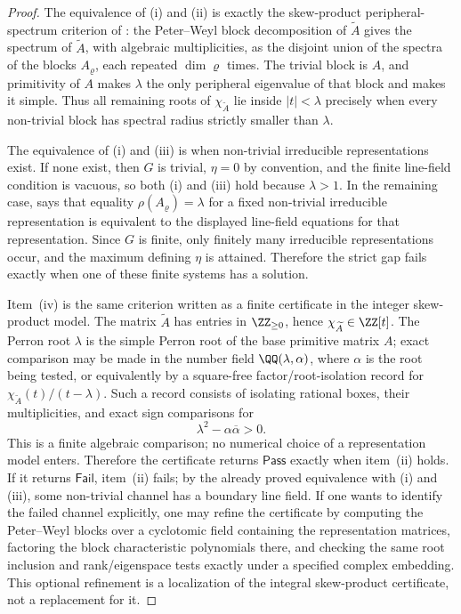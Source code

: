 \begin{proof}
  The equivalence of \rm(i) and \rm(ii) is exactly the skew-product
  peripheral-spectrum criterion of
  : the Peter--Weyl block
  decomposition of \(\widetilde A\) gives the spectrum of
  \(\widetilde A\), with algebraic multiplicities, as the disjoint union
  of the spectra of the blocks \(A_\varrho\), each repeated
  \(\dim\varrho\) times. The trivial block is \(A\), and primitivity of
  \(A\) makes \(\lambda\) the only peripheral eigenvalue of that block and
  makes it simple. Thus all remaining roots of
  \(\chi_{\widetilde A}\) lie inside \(|t|<\lambda\) precisely when every
  non-trivial block has spectral radius strictly smaller than \(\lambda\).

  The equivalence of \rm(i) and \rm(iii) is
   when non-trivial irreducible
  representations exist. If none exist, then \(G\) is trivial, \(\eta=0\)
  by convention, and the finite line-field condition is vacuous, so both
  \rm(i) and \rm(iii) hold because \(\lambda>1\). In the remaining case,
   says that equality
  \(\rho(A_\varrho)=\lambda\) for a fixed non-trivial irreducible
  representation is equivalent to the displayed line-field equations for
  that representation. Since \(G\) is finite, only finitely many
  irreducible representations occur, and the maximum defining \(\eta\) is
  attained. Therefore the strict gap fails exactly when one of these
  finite systems has a solution.

  Item~\rm(iv) is the same criterion written as a finite certificate in the
  integer skew-product model.  The matrix \(\widetilde A\) has entries in
  \(\ZZ_{\ge0}\), hence \(\chi_{\widetilde A}\in\ZZ[t]\).  The Perron root
  \(\lambda\) is the simple Perron root of the base primitive matrix \(A\);
  exact comparison may be made in the number field
  \(\QQ(\lambda,\alpha)\), where \(\alpha\) is the root being tested, or
  equivalently by a square-free factor/root-isolation record for
  \(\chi_{\widetilde A}(t)/(t-\lambda)\).  Such a record consists of
  isolating rational boxes, their multiplicities, and exact sign
  comparisons for
  \[
    \lambda^2-\alpha\overline{\alpha}>0 .
  \]
  This is a finite algebraic comparison; no numerical choice of a
  representation model enters.  Therefore the certificate returns
  \(\mathsf{Pass}\) exactly when item~\rm(ii) holds.  If it returns
  \(\mathsf{Fail}\), item~\rm(ii) fails; by the already proved equivalence
  with \rm(i) and \rm(iii), some non-trivial channel has a boundary line
  field.  If one wants to identify the failed channel explicitly, one may
  refine the certificate by computing the Peter--Weyl blocks over a
  cyclotomic field containing the representation matrices, factoring the
  block characteristic polynomials there, and checking the same root
  inclusion and rank/eigenspace tests exactly under a specified complex
  embedding.  This optional refinement is
  a localization of the integral skew-product certificate, not a replacement
  for it.


\end{proof}

